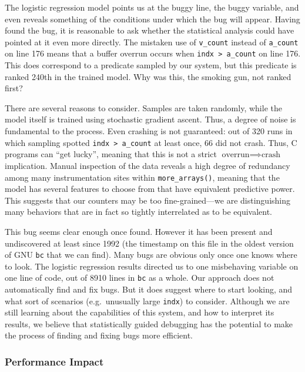 The logistic regression model points us at the buggy line, the buggy
variable, and even reveals something of the conditions under which the
bug will appear.  Having found the bug, it is reasonable to ask
whether the statistical analysis could have pointed at it even more
directly.  The mistaken use of \texttt{v\_count} instead of
\texttt{a\_count} on line 176 means that a buffer overrun occurs when
\texttt{indx > a\_count} on line 176.  This does correspond to a
predicate sampled by our system, but this predicate is ranked 240th in
the trained model.  Why was this, the smoking gun, not ranked first?

There are several reasons to consider.  Samples are taken randomly,
while the model itself is trained using stochastic gradient ascent.
Thus, a degree of noise is fundamental to the process.  Even crashing
is not guaranteed: out of 320 runs in which sampling spotted
\texttt{indx > a\_count} at least once, 66 did not crash.  Thus, C
programs can ``get lucky'', meaning that this is not a strict
$\text{overrun} \implies \text{crash}$ implication.  Manual inspection
of the data reveals a high degree of redundancy among many
instrumentation sites within \texttt{more\_arrays()}, meaning that the
model has several features to choose from that have equivalent
predictive power.  This suggests that our counters may be too
fine-grained---we are distinguishing many behaviors that are in
fact so tightly interrelated as to be equivalent.  

This bug seems clear enough once found.  However it has been present
and undiscovered at least since 1992 (the time\-stamp on this file in
the oldest version of GNU \texttt{bc} that we can find).  Many bugs
are obvious only once one knows where to look.  The logistic
regression results directed us to one misbehaving variable on one line
of code, out of 8910 lines in \texttt{bc} as a whole.  Our approach
does not automatically find and fix bugs.  But it does suggest where
to start looking, and what sort of scenarios (e.g.\ unusually large
\texttt{indx}) to consider.  Although we are still learning about the
capabilities of this system, and how to interpret its results, we
believe that statistically guided debugging has the potential to make
the process of finding and fixing bugs more efficient.

\subsubsection{Performance Impact}

